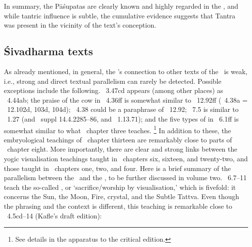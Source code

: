In summary, the Pāśupatas are clearly known and highly regarded in the \VSS, 
and while tantric influence is subtle, the cumulative evidence suggests
that Tantra was present in the vicinity of the text's conception. 


\subsection{Śivadharma texts}
\label{vss_connection_other_sd_texts}

As already mentioned, in general, the \VSS's connection to other texts of 
the \Sivadharmacorpus\ is weak, i.e., strong and direct textual parallelism can rarely be detected.
Possible exceptions include the following.
\VSS\ 3.47cd appears (among other places) as \SDHU\ 4.44ab;
the praise of the cow in \VSS\ 4.36ff is somewhat similar to \SDHU\ 12.92ff (\VSS\ 4.38a = \SDHU\ 12.102d, 103d, 104d);
\VSS\ 4.38 could be a paraphrase of \SDHU\ 12.92; 
\VSS\ 7.5 is similar to \SDHU\ 1.27 (and \MBH\ suppl 14.4.2285--86, and \NARADAP\ 1.13.71);
and the five types of  in \VSS\ 6.1ff is somewhat similar to what \SDHU\ chapter three teaches.%
                \footnote{See details in the apparatus to the critical edition.}
In addition to these, the embryological teachings of \VSS\ chapter thirteen are
remarkably close to parts of \SDHU\ chapter eight.
More importantly, there are clear and strong links between the yogic visualisation teachings
taught in \VSS\ chapters six, sixteen, and twenty-two, and those taught in \DharmP\ chapters one, two, and four.
\label{dharmaputrika}
Here is a brief summary of the parallelism between the \VSS\ and the \DHARMP, 
to be further discussed in volume two.
\VSS\ 6.7--11 teach the so-called ,\label{dhyanayajna}
or `sacrifice/worship by visualisation,' which is fivefold: it concerns
the Sun, the Moon, Fire, crystal, and the Subtle Tattva.
Even though the phrasing and the context is different, 
this teaching is remarkable close to \DHARMP\ 4.5cd--14 (Kafle's draft edition):

